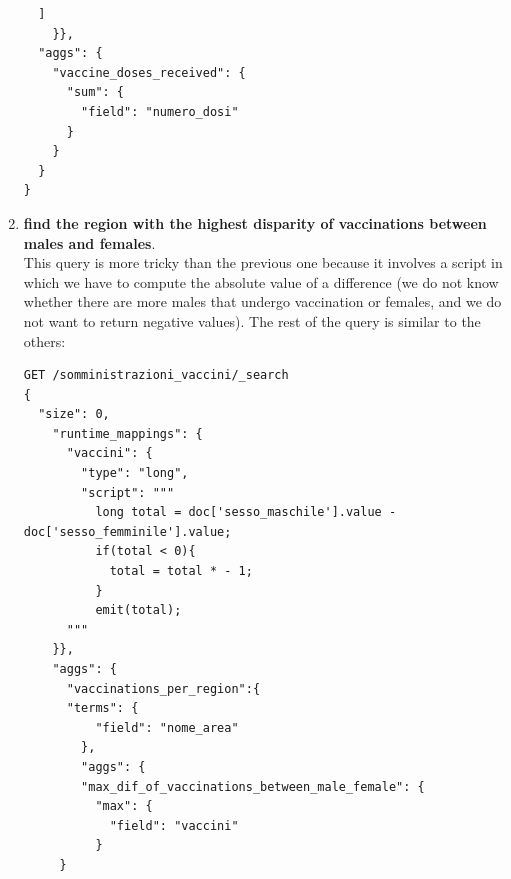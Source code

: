 \documentclass{article}
\begin{document}
\begin{enumerate}
\begin{lstlisting}
  ]
    }},
  "aggs": {
    "vaccine_doses_received": {
      "sum": {
        "field": "numero_dosi"
      }
    }
  }
}
\end{lstlisting}
\item \textbf{find the region with the highest disparity of vaccinations between males and females}.\\
This query is more tricky than the previous one because it involves a script in which we have to compute the absolute value of a difference (we do not know whether there are more males that undergo vaccination or females, and we do not want to return negative values). The rest of the query is similar to the others:
\begin{lstlisting}
GET /somministrazioni_vaccini/_search
{
  "size": 0,
    "runtime_mappings": {
      "vaccini": {
        "type": "long",
        "script": """
          long total = doc['sesso_maschile'].value - doc['sesso_femminile'].value;
          if(total < 0){
            total = total * - 1;
          }
          emit(total);
      """
    }},
    "aggs": {
      "vaccinations_per_region":{
      "terms": {
          "field": "nome_area"
        },
        "aggs": {
        "max_dif_of_vaccinations_between_male_female": {
          "max": {
            "field": "vaccini"
          }
     }
          

\end{lstlisting}
\end{enumerate}
\end{document}
